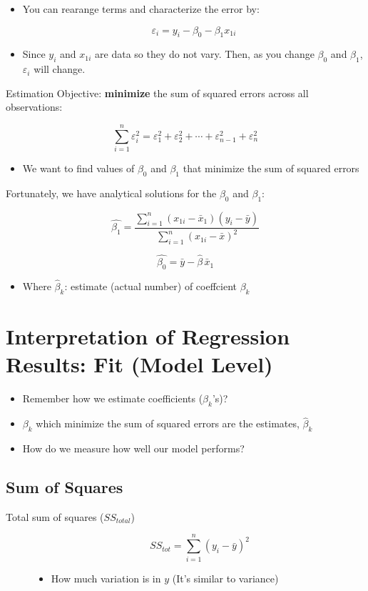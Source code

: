 \documentclass[10pt,article]{article}
\begin{document}
\begin{itemize}
\item You can rearange terms
and characterize the error by:

\[  \varepsilon_{i} =  y_{i} -  \beta_0 - \beta_{1} x_{1i} \]

\item Since \(y_i\) and \(x_{1i}\) are data so they do not vary. Then, as you
change \(\beta_0\) and \(\beta_1\), \(\varepsilon_{i}\) will change.
\end{itemize}

Estimation Objective: \textbf{minimize} the sum of squared errors across all
observations:

\[ \sum_{i=1}^n\varepsilon^2_i = \varepsilon^2_1 + \varepsilon^2_2 + \cdots +
   \varepsilon^2_{n-1} + \varepsilon^2_{n} \]

\begin{itemize}
\item We want to find values of \(\beta_0\) and \(\beta_1\) that minimize the
sum of squared errors
\end{itemize}

Fortunately, we have analytical solutions for the \(\beta_0\) and \(\beta_1\):

\[ \widehat{\beta_1} = \frac{ \sum_{i=1}^{n}
   (x_{1i}-\bar{x}_1)(y_{i}-\bar{y}) }{ \sum_{i=1}^{n} (x_{1i}-\bar{x})^2 }
   \]



\[ \widehat{\beta_0}  = \bar{y} - \widehat\beta\,\bar{x}_{1} \]

\begin{itemize}
\item Where \(\widehat{\beta}_{k}\): estimate (actual number) of coeffcient \(\beta_k\)
\end{itemize}
\section{Interpretation of Regression Results: Fit (Model Level)}
\label{sec:org8330a9f}
\begin{itemize}
\item Remember how we estimate coefficients (\(\beta_k\)'s)?
\item \(\beta_k\) which minimize the sum of squared errors are the
estimates, \(\widehat\beta_k\)
\item How do we measure how well our model performs?
\end{itemize}

\subsection{Sum of Squares}
\label{sec:orgedb92b6}
\begin{description}
\item[{Total sum of squares (\(SS_{total}\))}] \quad

\[  SS_{tot} = \sum_{i=1}^n (y_i - \bar{y})^2 \]

\begin{itemize}
\item How much variation is in \(y\) (It's similar to variance)
\end{itemize}
\end{description}
\end{document}

